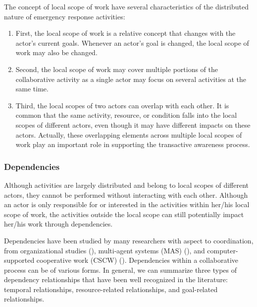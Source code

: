 The concept of local scope of work have several characteristics of the distributed nature of emergency response activities:

\begin{enumerate}
	\item First, the local scope of work is a relative concept that changes with the actor’s current goals. Whenever an actor’s goal is changed, the local scope of work may also be changed.
	\item Second, the local scope of work may cover multiple portions of the collaborative activity as a single actor may focus on several activities at the same time. 
	\item Third, the local scopes of two actors can overlap with each other. It is common that the same activity, resource, or condition falls into the local scopes of different actors, even though it may have different impacts on these actors. Actually, these overlapping elements across multiple local scopes of work play an important role in supporting the transactive awareness process.
\end{enumerate}

\subsubsection{Dependencies} %
\label{ssub:dependencies}
Although activities are largely distributed and belong to local scopes of different actors, they cannot be performed without interacting with each other. Although an actor is only responsible for or interested in the activities within her/his local scope of work, the activities outside the local scope can still potentially impact her/his work through dependencies. 

Dependencies have been studied by many researchers with aspect to coordination, from organizational studies (\cite{yu1993actor,crowston1994taxonomy}), multi-agent systems (MAS) (\cite{sichman1998social,sikora1998a,sichman2002multi}), and computer-supported cooperative work (CSCW) (\cite{raposo2002coordination,cataldo2006a,de2007supporting}). Dependencies within a collaborative process can be of various forms. In general, we can summarize three types of dependency relationships that have been well recognized in the literature: temporal relationships, resource-related relationships, and goal-related relationships.

